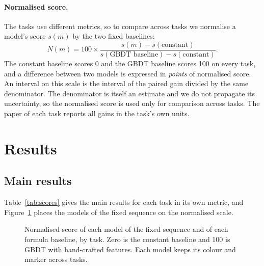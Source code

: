 \documentclass[11pt]{article}
\begin{document}
\paragraph{Normalised score.}
The tasks use different metrics, so to compare across tasks we normalise a
model's score $s(m)$ by the two fixed baselines:
\[
  N(m) = 100 \times \frac{s(m) - s(\text{constant})}{s(\text{GBDT baseline}) - s(\text{constant})}.
\]
The constant baseline scores 0 and the GBDT baseline scores 100 on every
task, and a difference between two models is expressed in \emph{points} of
normalised score. An interval on this scale is the interval of the paired
gain divided by the same denominator. The denominator is itself an estimate
and we do not propagate its uncertainty, so the normalised score is used
only for comparison across tasks. The paper of each task reports all gains in
the task's own units.

\section{Results}
\label{sec:across}

\subsection{Main results}

Table~\ref{tab:scores} gives the main results for each task in its own
metric, and Figure~\ref{fig:shares} places the models of the fixed sequence
on the normalised scale.

\begin{table}[htbp]\centering\small
{}
\caption{Main results on the test set: the constant baseline, GBDT on context
features, GBDT with hand-crafted features (the GBDT baseline), and the best
neural network with its paired gain over the GBDT baseline, in the task's
metric (\emph{Gain}) and in points of normalised score (\emph{Norm.\ gain}).
A gain in bold is statistically significant.
Figure~\ref{fig:networks} shows the confidence intervals, and
Appendix~\ref{sec:runs} lists every model.}
\label{tab:scores}
\end{table}

\begin{figure}[htbp]\centering
{}
\caption{Normalised score of each model of the fixed sequence and of each
formula baseline, by task. Zero is the constant baseline and 100 is GBDT with
hand-crafted features. Each model keeps its colour and marker across tasks.}
\label{fig:shares}
\end{figure}
\end{document}
